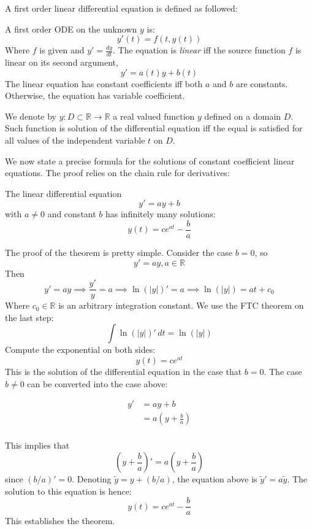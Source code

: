 A first order linear differential equation  is defined as followed:
\begin{definition}
    A first order ODE on the unknown $y$ is:
    $$y'(t)=f(t,y(t))$$
    Where $f$ is given and $y'=\frac{dy}{dt}$. The equation is \textit{linear} iff the source function $f$ is linear on its second argument, $$y'=a(t)y+b(t)$$ The linear equation has constant coefficients iff both $a$ and $b$ are constants. Otherwise, the equation has variable coefficient.
\end{definition}

We denote by $y:D\subset \mathbb{R}\to \mathbb{R}$ a real valued function $y$ defined on a domain $D$. Such function is solution of the differential equation iff the equal is satisfied for all values of the independent variable $t$ on $D$. 

We now state a precise formula for the solutions of constant coefficient linear equations. The proof relies on the chain rule for derivatives:
\begin{theorem}
    The linear differential equation $$y'=ay+b$$ with $a\neq 0$ and constant $b$ has infinitely many solutions: $$y(t)=ce^{at}-\frac{b}{a}$$
\end{theorem}
The proof of the theorem is pretty simple. Consider the case $b=0$, so $$y'=ay,a\in \mathbb{R}$$
Then $$y'=ay\implies \frac{y'}{y}=a\implies \ln{(\lvert y \rvert )}'=a\implies \ln(\lvert y \rvert )=at+c_{0}$$
Where $c_{0}\in\mathbb{R}$ is an arbitrary integration constant. We use the FTC theorem on the last step:
$$\int \ln{(\lvert y \rvert )}' \, dt=\ln{(\lvert y \rvert )} $$
Compute the exponential on both sides:
$$y(t)=ce^{at}$$
This is the solution of the differential equation in the case that $b=0$. The case $b\neq 0$ can be converted into the case above:

\begin{equation*}
    \begin{split}
        y' & = ay+b\\
        & = a\left( y+\frac{b}{a} \right)\\
        \end{split}
\end{equation*}


This implies that $$\left( y+\frac{b}{a} \right)'=a\left( y+\frac{b}{a} \right)$$
since $(b/a)'=0$. Denoting $\tilde{y}=y+(b/a)$, the equation above is $\tilde{y}'=a \tilde{y}$. The solution to this equation is hence: $$y(t)=ce^{at}-\frac{b}{a}$$
This establishes the theorem. 

